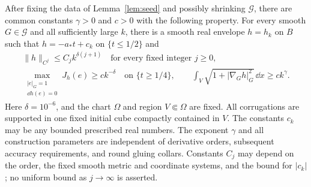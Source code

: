\begin{proposition}\label{prop:envelope}
After fixing the data of Lemma~\ref{lem:seed} and possibly shrinking
$\mathcal G$, there are common constants $\gamma>0$ and $c>0$
with the following property.  For every smooth $G\in\mathcal G$
and all sufficiently large $k$, there is a smooth real envelope
$h=h_k$ on $B$ such that $h=-a_*t+c_k$ on $\{t\le1/2\}$ and
\begin{equation}\label{eq:envelope-bounds}
 \begin{gathered}
  \|h\|_{C^j}\le C_j k^{\delta(j+1)}
  \quad\text{for every fixed integer }j\ge0,\\
  \max_{\substack{|e|_G=1\\\dd h(e)=0}}J_h(e)
       \ge c k^{-\delta}\quad\text{on }\{t\ge1/4\},
  \qquad
  \int_V\sqrt{1+|\nabla_Gh|_G^2}\,\dd x\ge c k^\gamma.
 \end{gathered}
\end{equation}
Here $\delta=10^{-6}$, and the chart $\Omega$ and region
$V\Subset\Omega$ are fixed.  All corrugations are supported in
one fixed initial cube compactly contained in $V$.
The constants $c_k$ may be any bounded prescribed real numbers.
The exponent $\gamma$ and all construction parameters are
independent of derivative orders, subsequent accuracy requirements,
and round gluing collars.  Constants $C_j$ may depend on the order,
the fixed smooth metric and coordinate systems, and the bound for
$|c_k|$; no uniform bound as $j\to\infty$ is asserted.
\end{proposition}

